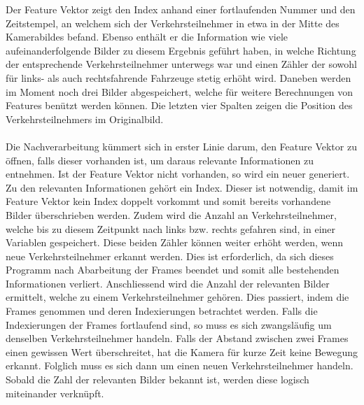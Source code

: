 \setlength\tabcolsep{0pt}

Der Feature Vektor zeigt den Index anhand einer fortlaufenden Nummer und den Zeitstempel, an welchem sich der Verkehrsteilnehmer in etwa in der Mitte des Kamerabildes befand. Ebenso enthält er die Information wie viele aufeinanderfolgende Bilder zu diesem Ergebnis geführt haben, in welche Richtung der entsprechende Verkehrsteilnehmer unterwegs war und einen Zähler der sowohl für links- als auch rechtsfahrende Fahrzeuge stetig erhöht wird. Daneben werden im Moment noch drei Bilder abgespeichert, welche für weitere Berechnungen von Features benützt werden können. Die letzten vier Spalten zeigen die Position des Verkehrsteilnehmers im Originalbild.\\\\
Die Nachverarbeitung kümmert sich in erster Linie darum, den Feature Vektor zu öffnen, falls dieser vorhanden ist, um daraus relevante Informationen zu entnehmen. Ist der Feature Vektor nicht vorhanden, so wird ein neuer generiert. Zu den relevanten Informationen gehört ein Index. Dieser ist notwendig, damit im Feature Vektor kein Index doppelt vorkommt und somit bereits vorhandene Bilder überschrieben werden. Zudem wird die Anzahl an Verkehrsteilnehmer, welche bis zu diesem Zeitpunkt nach links bzw. rechts gefahren sind, in einer Variablen gespeichert. Diese beiden Zähler können weiter erhöht werden, wenn neue Verkehrsteilnehmer erkannt werden. Dies ist erforderlich, da sich dieses Programm nach Abarbeitung der Frames beendet und somit alle bestehenden Informationen verliert. Anschliessend wird die Anzahl der relevanten Bilder ermittelt, welche zu einem Verkehrsteilnehmer gehören. Dies passiert, indem die Frames genommen und deren Indexierungen betrachtet werden. Falls die Indexierungen der Frames fortlaufend sind, so muss es sich zwangsläufig um denselben Verkehrsteilnehmer handeln. Falls der Abstand zwischen zwei Frames einen gewissen Wert überschreitet, hat die Kamera für kurze Zeit keine Bewegung erkannt. Folglich muss es sich dann um einen neuen Verkehrsteilnehmer handeln. Sobald die Zahl der relevanten Bilder bekannt ist, werden diese logisch miteinander verknüpft.\\\\
